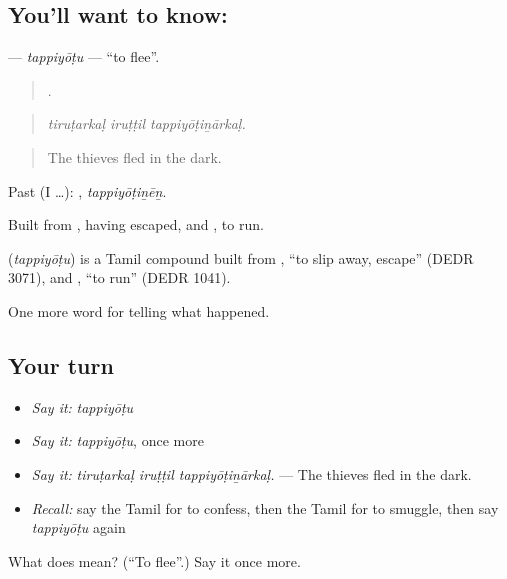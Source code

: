 \subsection*{You'll want to know: }
\textbf{} — \emph{tappiyōṭu} — \textquotedblleft{}to flee\textquotedblright{}.

\begin{quote}
  .
\end{quote}

\begin{quote}
\emph{tiruṭarkaḷ iruṭṭil tappiyōṭiṉārkaḷ.}
\end{quote}

\begin{quote}
The thieves fled in the dark.
\end{quote}

Past (I …): , \emph{tappiyōṭiṉēṉ}.

Built from , having escaped, and , to run.

\begin{cousinweb}
\textbf{} (\emph{tappiyōṭu}) is a Tamil compound built from , \textquotedblleft{}to slip away, escape\textquotedblright{} (DEDR 3071), and , \textquotedblleft{}to run\textquotedblright{} (DEDR 1041).
\end{cousinweb}

\begin{grammarlens}[title={What you've built}]
One more word for telling what happened.
\end{grammarlens}

\subsection*{Your turn}
\begin{itemize}
\raggedright
  \item \emph{Say it:} \emph{tappiyōṭu}
  \item \emph{Say it:} \emph{tappiyōṭu}, once more
  \item \emph{Say it:} \emph{tiruṭarkaḷ iruṭṭil tappiyōṭiṉārkaḷ.} — The thieves fled in the dark.
  \item \emph{Recall:} say the Tamil for to confess, then the Tamil for to smuggle, then say \emph{tappiyōṭu} again
\end{itemize}

\begin{tcolorbox}[breakable,colback=teal!4,colframe=teal!35!black,title={Before you move on}]
What does  mean? (\textquotedblleft{}To flee\textquotedblright{}.) Say it once more.
\end{tcolorbox}
